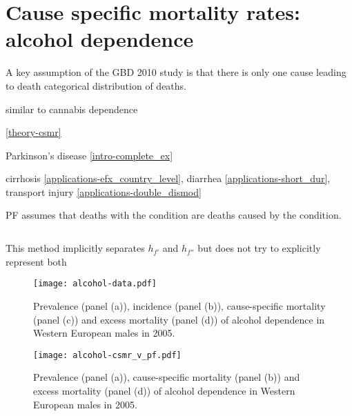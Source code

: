 \chapter{Cause specific mortality rates: alcohol dependence}
\label{applications-csmr}

A key assumption of the GBD 2010 study is that there is only one cause leading to death categorical distribution of deaths.

similar to cannabis dependence \pageref{tab:app-substance_dependence}



\ref{theory-csmr}

Parkinson's disease \ref{intro-complete_ex}

cirrhosis \ref{applications-efx_country_level}, diarrhea \ref{applications-short_dur}, transport injury \ref{applications-double_dismod}

PF assumes that deaths with the condition are deaths caused by the condition.

\begin{equation}
    
\end{equation}

This method implicitly separates $h_{f'}$ and $h_{f''}$ but does not try to explicitly represent both

    \begin{figure}[h]
        \begin{center}
            \texttt{[image: alcohol-data.pdf]}
            \caption{Prevalence (panel (a)), incidence (panel (b)), cause-specific mortality (panel (c)) and excess mortality (panel (d)) of alcohol dependence in Western European males in 2005.}
            \label{fig:app-alcohol data}
        \end{center}
    \end{figure} 
    
    \begin{figure}[h]
        \begin{center}
            \texttt{[image: alcohol-csmr\_v\_pf.pdf]}
            \caption{Prevalence (panel (a)), cause-specific mortality (panel (b)) and excess mortality (panel (d)) of alcohol dependence in Western European males in 2005.}
            \label{fig:app-alcohol compare}
        \end{center}
    \end{figure} 